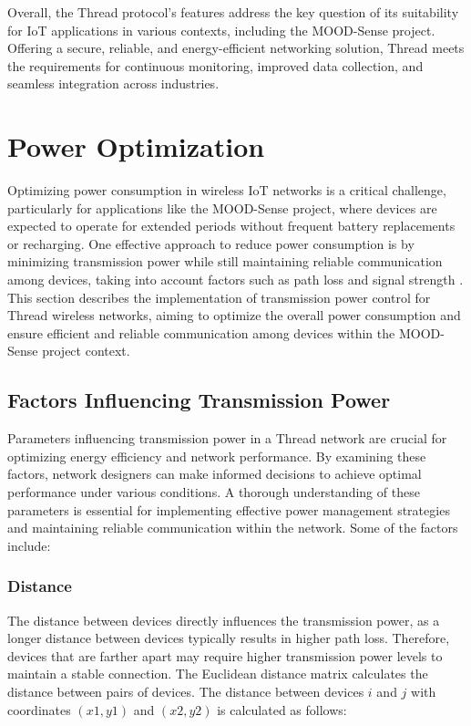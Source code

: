 Overall, the Thread protocol's features address the key question of its suitability for \gls{IoT} applications in various contexts, including the MOOD-Sense project. Offering a secure, reliable, and energy-efficient networking solution, Thread meets the requirements for continuous monitoring, improved data collection, and seamless integration across industries.


\section{Power Optimization}\label{sec:power_optimization}

Optimizing power consumption in wireless \gls{IoT} networks is a critical challenge, particularly for applications like the MOOD-Sense project, where devices are expected to operate for extended periods without frequent battery replacements or recharging. One effective approach to reduce power consumption is by minimizing transmission power while still maintaining reliable communication among devices, taking into account factors such as path loss and signal strength \cite{sheth2002implementation}. This section describes the implementation of transmission power control for Thread wireless networks, aiming to optimize the overall power consumption and ensure efficient and reliable communication among devices within the MOOD-Sense project context.

\subsection{Factors Influencing Transmission Power}

Parameters influencing transmission power in a Thread network are crucial for optimizing energy efficiency and network performance. By examining these factors, network designers can make informed decisions to achieve optimal performance under various conditions. A thorough understanding of these parameters is essential for implementing effective power management strategies and maintaining reliable communication within the network. Some of the factors include:

\subsubsection{Distance}

The distance between devices directly influences the transmission power, as a longer distance between devices typically results in higher path loss. Therefore, devices that are farther apart may require higher transmission power levels to maintain a stable connection. The Euclidean distance matrix calculates the distance between pairs of devices. The distance between devices $i$ and $j$ with coordinates $\left(x1,y1\right)$ and $\left(x2,y2\right)$ is calculated as follows:

